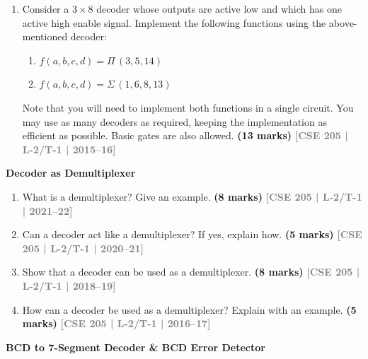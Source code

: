 \documentclass[12pt,a3paper]{article}
\newcommand{\yr}[1]{\hfill\textcolor{gray}{\small\textbf{[#1]}}}
\newcommand{\mk}[1]{\textcolor{orange!70!black}{\small\textbf{(#1 marks)}}}
\newcommand{\subtopic}[2]{%
  \vspace{10pt}
  \noindent\begin{tcolorbox}[colback=#1!8,colframe=#1,boxrule=0.6pt,arc=4pt,
    left=6pt,right=6pt,top=4pt,bottom=4pt]
    \small\bfseries\textcolor{#1}{#2}
  \end{tcolorbox}
  \vspace{2pt}
}
\begin{document}
\begin{enumerate}
\item Consider a $3 \times 8$ decoder whose outputs are active low and which has one active high enable signal. Implement the following functions using the above-mentioned decoder:
\begin{enumerate}
  \item $f(a,b,c,d) = \Pi\,(3,5,14)$
  \item $f(a,b,c,d) = \Sigma\,(1,6,8,13)$
  
  \end{enumerate}
Note that you will need to implement both functions in a single circuit. You may use as many decoders as required, keeping the implementation as efficient as possible. Basic gates are also allowed.
\mk{13} \yr{CSE 205 | L-2/T-1 | 2015--16}

\end{enumerate}

\subtopic{cD}{Decoder as Demultiplexer}
\label{sub:s4-demux}

\begin{enumerate}
  

\item What is a demultiplexer? Give an example.
\mk{8} \yr{CSE 205 | L-2/T-1 | 2021--22}


\item Can a decoder act like a demultiplexer? If yes, explain how.
\mk{5} \yr{CSE 205 | L-2/T-1 | 2020--21}

\item Show that a decoder can be used as a demultiplexer.
\mk{8} \yr{CSE 205 | L-2/T-1 | 2018--19}

\item How can a decoder be used as a demultiplexer? Explain with an example.
\mk{5} \yr{CSE 205 | L-2/T-1 | 2016--17}

\end{enumerate}

\subtopic{cD}{BCD to 7-Segment Decoder \& BCD Error Detector}
\label{sub:s4-bcd}
\end{document}
